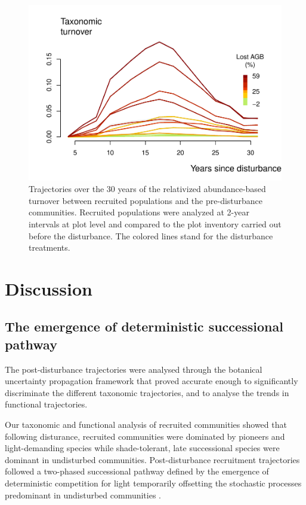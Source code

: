 \documentclass[fleqn,10pt]{ArtEcoFoG} %
\begin{document}
\begin{figure}

{\centering \includegraphics[width=1\linewidth]{RecruitmentTrajectories_files/figure-latex/Turnover-1} 

}

\caption{ Trajectories over the 30 years of the relativized abundance-based turnover between recruited populations and the pre-disturbance communities. Recruited populations were analyzed at 2-year intervals at plot level and compared to the plot inventory carried out before the disturbance. The colored lines stand for the disturbance treatments.}\label{fig:Turnover}
\end{figure}

\hypertarget{discussion}{%
\section{Discussion}\label{discussion}}

\hypertarget{the-emergence-of-deterministic-successional-pathway}{%
\subsection{The emergence of deterministic successional pathway}\label{the-emergence-of-deterministic-successional-pathway}}

The post-disturbance trajectories were analysed through the botanical uncertainty propagation framework that proved accurate enough to significantly discriminate the different taxonomic trajectories, and to analyse the trends in functional trajectories.

Our taxonomic and functional analysis of recruited communities showed that following disturance, recruited communities were dominated by pioneers and light-demanding species while shade-tolerant, late successional species were dominant in undisturbed communities.
Post-disturbance recruitment trajectories followed a two-phased successional pathway defined by the emergence of deterministic competition for light temporarily offsetting the stochastic processes predominant in undisturbed communities \citep{Clements1916, Denslow2000, Meiners2015}.
\end{document}
